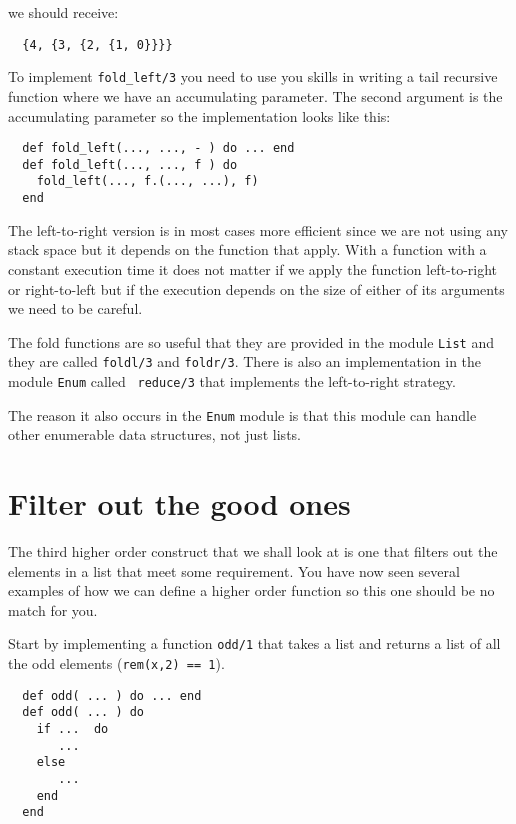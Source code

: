 \documentclass[a4paper,11pt]{article}
\begin{document}
we should receive:

\begin{verbatim}
  {4, {3, {2, {1, 0}}}}
\end{verbatim}

To implement {\tt fold\_left/3} you need to use you skills in writing a
tail recursive function where we have an accumulating parameter. The
second argument is the accumulating parameter so the implementation
looks like this:

\begin{verbatim}
  def fold_left(..., ..., - ) do ... end
  def fold_left(..., ..., f ) do
    fold_left(..., f.(..., ...), f) 
  end  
\end{verbatim}

The left-to-right version is in most cases more efficient since we are
not using any stack space but it depends on the function that
apply. With a function with a constant execution time it does not
matter if we apply the function left-to-right or right-to-left but if
the execution depends on the size of either of its arguments we need
to be careful.

The fold functions are so useful that they are provided in the module
{\tt List} and they are called {\tt foldl/3} and {\tt foldr/3}. There
is also an implementation in the module {\tt Enum} called {\tt
  reduce/3} that implements the left-to-right strategy.

The reason it also occurs in the {\tt Enum} module is that this module
can handle other enumerable data structures, not just lists.

\section*{Filter out the good ones}

The third higher order construct that we shall look at is one that
filters out the elements in a list that meet some requirement. You
have now seen several examples of how we can define a higher order
function so this one should be no match for you.

Start by implementing a function {\tt odd/1} that takes a list and
returns a list of all the odd elements ({\tt rem(x,2) == 1}).

\begin{verbatim}
  def odd( ... ) do ... end
  def odd( ... ) do
    if ...  do
       ... 
    else
       ...
    end
  end
\end{verbatim}
\end{document}

